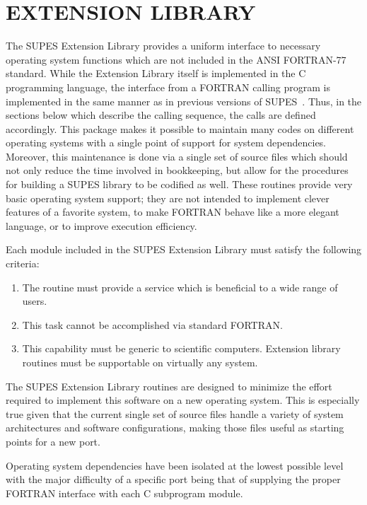 \chapter{EXTENSION LIBRARY} \label{sec:extlib}
The SUPES Extension Library provides a uniform interface to
necessary operating system functions which are not included in the ANSI
FORTRAN-77 standard.
While the Extension Library itself is implemented in the C programming language,
the interface from a FORTRAN calling program is implemented in
the same manner as in previous versions of SUPES~\cite{SUPES}.
Thus, in the sections below which describe the calling sequence,
the calls are defined accordingly.
This package makes it possible to maintain many codes on
different operating systems with a single point of support for system
dependencies.
Moreover,
this maintenance is done via a single set of source files which
should not only reduce the time involved in bookkeeping,
but allow for the procedures for building a SUPES library to be codified
as well.
These routines provide very basic operating system support;
they are not intended to implement clever features of a favorite system, to
make FORTRAN behave like a more elegant language, or to improve execution
efficiency.

Each module included in the SUPES Extension Library must satisfy the
following criteria:
\begin{enumerate}
\item The routine must provide a service which is beneficial to a wide
range of users.

\item This task cannot be accomplished via standard FORTRAN.

\item This capability must be generic to scientific computers.  Extension
library routines must be supportable on virtually any system.
\end{enumerate}

The SUPES Extension Library routines are designed to minimize the
effort required to implement this software on a new operating system.
This is especially true given that the current single set of source
files handle a variety of system architectures and software
configurations, making those files useful as starting points for a new
port.

Operating system dependencies have been isolated at the lowest
possible level with the major difficulty of a specific port being that
of supplying the proper FORTRAN interface with each C subprogram
module.

